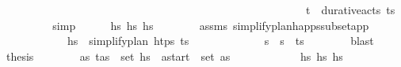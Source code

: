 \begin{isabellebody}
\ \ \ \ \ \ \ \ \ \ \ \ \ \ \ \ \ \ \ \ \ \ \ \ \ \ \ \ \ \ \ \ \ \ \ \ \ \ \ \ \ \ \ \ \ \ \ \ \ \ \ \ \ \ \ {\isacartoucheopen}{\isacharparenleft}{\kern0pt}t\isactrlsub {\isasympi}{\isacharcomma}{\kern0pt}{\isasympi}{\isacharparenright}{\kern0pt}\ {\isasymin}\ durative{\isacharunderscore}{\kern0pt}acts\ {\isacharparenleft}{\kern0pt}{\isacharparenleft}{\kern0pt}t\isactrlsub {\isasympi}{\isacharcomma}{\kern0pt}{\isasympi}{\isacharparenright}{\kern0pt}{\isacharhash}{\kern0pt}{\isasympi}s\ \isanewline
\ \ \ \ \ \ \isamarkupfalse%
\ simp\isanewline
\ \ \ \ \isamarkupfalse%
\ {\isachardoublequoteopen}hs{\isacharprime}{\kern0pt}\ {\isasymsubseteq}\isactrlsub h\isactrlsub s\ hs{\isachardoublequoteclose}\isanewline
\ \ \ \ \ \ \isamarkupfalse%
\ assms\ simplify{\isacharunderscore}{\kern0pt}plan{\isacharunderscore}{\kern0pt}happs{\isacharunderscore}{\kern0pt}subset{\isacharunderscore}{\kern0pt}app\ \isanewline
\ \ \ \ \ \ \ \ \ \ \ \ {\isacartoucheopen}hs{\isacharprime}{\kern0pt}\ {\isacharequal}{\kern0pt}\ simplify{\isacharunderscore}{\kern0pt}plan\ htps\ {\isacharparenleft}{\kern0pt}{\isacharparenleft}{\kern0pt}t\isactrlsub {\isasympi}{\isacharcomma}{\kern0pt}{\isasympi}{\isacharparenright}{\kern0pt}{\isacharhash}{\kern0pt}{\isasympi}s\ \isanewline
\ \ \ \ \ \ \ \ \ \ \ \ {\isacartoucheopen}{\isasympi}s\ {\isacharequal}{\kern0pt}\ {\isasympi}s\ {\isacharat}{\kern0pt}\ {\isacharparenleft}{\kern0pt}{\isacharparenleft}{\kern0pt}t\isactrlsub {\isasympi}{\isacharcomma}{\kern0pt}{\isasympi}{\isacharparenright}{\kern0pt}{\isacharhash}{\kern0pt}{\isasympi}s\isanewline
\ \ \ \ \ \ \isamarkupfalse%
\ blast\isanewline
\ \ \ \ \isamarkupfalse%
\ {\isacharquery}{\kern0pt}thesis\isanewline
\ \ \ \ \ \ \isamarkupfalse%
\ {\isacartoucheopen}{\isasymexists}as{\isachardot}{\kern0pt}\ {\isacharparenleft}{\kern0pt}t\isactrlsub {\isasympi}{\isacharcomma}{\kern0pt}as{\isacharparenright}{\kern0pt}\ {\isasymin}\ set\ hs{\isacharprime}{\kern0pt}\ {\isasymand}\ a\isactrlsub s\isactrlsub t\isactrlsub a\isactrlsub r\isactrlsub t\ {\isasymin}\ set\ as{\isacartoucheclose}\isanewline
\ \ \ \ \ \ \ \ \ \ \ \ {\isacartoucheopen}hs{\isacharprime}{\kern0pt}\ {\isasymsubseteq}\isactrlsub h\isactrlsub s\ hs{\isacartoucheclose}\isanewline

\end{isabellebody}
